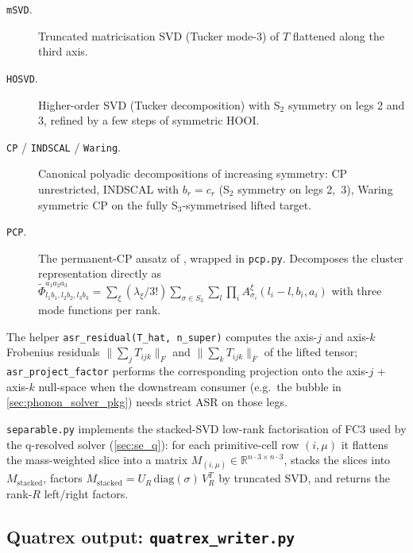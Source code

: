 \begin{description}
  \item[\texttt{mSVD}.]  Truncated matricisation SVD (Tucker mode-3) of
        $T$ flattened along the third axis.
  \item[\texttt{HOSVD}.]  Higher-order SVD (Tucker decomposition) with
        S$_2$ symmetry on legs 2 and 3, refined by a few steps of
        symmetric HOOI.
  \item[\texttt{CP} / \texttt{INDSCAL} / \texttt{Waring}.]
        Canonical polyadic decompositions of increasing symmetry: CP
        unrestricted, INDSCAL with $b_r = c_r$ (S$_2$ symmetry on legs
        2,~3), Waring symmetric CP on the fully S$_3$-symmetrised
        lifted target.
  \item[\texttt{PCP}.]  The permanent-CP ansatz of
        \cite{luo_tensor_2025}, wrapped
        in \texttt{pcp.py}.  Decomposes the cluster representation
        directly as
        $\tilde\Phi_{l_1 b_1, l_2 b_2, l_3 b_3}^{a_1 a_2 a_3}
         = \sum_\xi (\lambda_\xi/3!) \sum_{\sigma\in S_3}\sum_l
           \prod_i A^\xi_{\sigma_i}(l_i - l, b_i, a_i)$
        with three mode functions per rank.
\end{description}

The helper \texttt{asr\_residual(T\_hat, n\_super)} computes the axis-$j$
and axis-$k$ Frobenius residuals
$\|\sum_j T_{ijk}\|_F$ and $\|\sum_k T_{ijk}\|_F$ of the lifted
tensor; \texttt{asr\_project\_factor} performs the corresponding
projection onto the axis-$j$ + axis-$k$ null-space when the downstream
consumer (e.g.\ the bubble in \cref{sec:phonon_solver_pkg}) needs
strict ASR on those legs.

\texttt{separable.py} implements the stacked-SVD low-rank
factorisation of FC3 used by the q-resolved solver
(\cref{sec:se_q}): for each primitive-cell row $(i, \mu)$ it
flattens the mass-weighted slice into a matrix
$M_{(i,\mu)} \in \mathbb{R}^{n\cdot 3 \times n \cdot 3}$, stacks the
slices into $M_\mathrm{stacked}$, factors $M_\mathrm{stacked} =
U_R\,\mathrm{diag}(\sigma)\,V_R^T$ by truncated SVD, and returns
the rank-$R$ left/right factors.

\subsection{Quatrex output: \texttt{quatrex\_writer.py}}
\label{sec:quatrex_writer}

